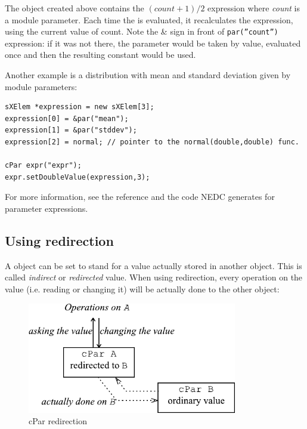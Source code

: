 The  object created above contains the $(count+1)/2$
expression where \textit{count} is a module parameter. Each time the
 is evaluated, it recalculates the expression, using the
current value of count. Note the \& sign in front of
\texttt{par(''count'')} expression: if it was not there, the parameter
would be taken by value, evaluated once and
then the resulting constant would be used.

Another example is a distribution with mean and
standard deviation given by module parameters:

\begin{Verbatim}
sXElem *expression = new sXElem[3];
expression[0] = &par("mean");
expression[1] = &par("stddev");
expression[2] = normal; // pointer to the normal(double,double) func.

cPar expr("expr");
expr.setDoubleValue(expression,3);
\end{Verbatim}


For more information, see the reference and the code NEDC generates 
for parameter expressions.



\subsection{Using redirection}

A  object can be set to stand for a value actually stored
in another  object. This is called \textit{indirect} or
\textit{redirected} value. When using redirection,
every operation on the value (i.e.  reading or changing it) will be
actually done to the other  object:

\begin{figure}[htbp]
  \begin{center}
    \includegraphics[width=3.608in, height=1.908in]{figures/usmanFig11}
    \caption{cPar redirection}
    \label{fig:ch-sim-lib:cPar-redirection}
  \end{center}
\end{figure}

